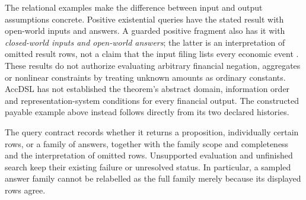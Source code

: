 The relational examples make the difference between input and output
assumptions concrete. Positive existential queries have the stated result
with open-world inputs and answers. A guarded positive fragment also has it
with \emph{closed-world inputs and open-world answers}; the latter is an
interpretation of omitted result rows, not a claim that the input filing
lists every economic event
\citep[Proposition~9 and Corollary~3, p.~20]{libkin2016certain}.
These results do not authorize evaluating arbitrary financial negation,
aggregates or nonlinear constraints by treating unknown amounts as ordinary
constants. AccDSL has not established the theorem's abstract domain,
information order and representation-system conditions for every financial
output. The constructed payable example above instead follows directly
from its two declared histories.

The query contract records whether it returns a proposition, individually
certain rows, or a family of answers, together with the family scope and
completeness and the interpretation of omitted rows. Unsupported evaluation
and unfinished search keep their existing failure or unresolved status. In
particular, a sampled answer family cannot be relabelled as the full family
merely because its displayed rows agree.
